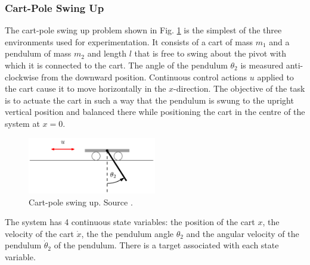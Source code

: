\subsubsection{Cart-Pole Swing Up}
The cart-pole swing up problem shown in Fig. \ref{Fig:cartpole-environment} is the simplest of the three environments used for experimentation. It consists of a cart of mass $m_1$ and a pendulum of mass $m_2$ and length $l$ that is free to swing about the pivot with which it is connected to the cart. The angle of the pendulum $\theta_2$ is measured anti-clockwise from the downward position. Continuous control actions $u$ applied to the cart cause it to move horizontally in the $x$-direction. The objective of the task is to actuate the cart in such a way that the pendulum is swung to the upright vertical position and balanced there while positioning the cart in the centre of the system at $x=0$.
\begin{figure}[H]
\centering    
\includegraphics[width=0.5\textwidth]{Chapter3/Figures/cart-pole.png}
\caption[Cart-pole PILCO environment]{Cart-pole swing up. Source \cite{deisenroth2013pilco-documentation}.}
\label{Fig:cartpole-environment}
\end{figure}
The system has 4 continuous state variables: the position of the cart $x$, the velocity of the cart $\dot x$, the the pendulum angle $\theta_2$ and the angular velocity of the pendulum $\dot \theta_2$ of the pendulum. There is a target associated with each state variable.

